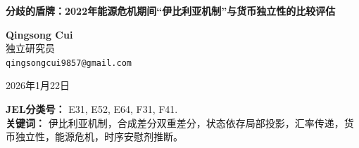 \documentclass[12pt, a4paper]{article}
\begin{document}
\begin{titlepage}
    \centering
    \vspace*{1cm}
    
    {\Large \textbf{分歧的盾牌：2022年能源危机期间“伊比利亚机制”与货币独立性的比较评估}}
    
    \vspace{1.5cm}
    
    \textbf{Qingsong Cui} \\ \relax
    独立研究员 \\ \relax
    \texttt{qingsongcui9857@gmail.com}
    
    \vspace{1cm}
    2026年1月22日
    
    \vspace{2cm}
    
    \begin{abstract}
        \noindent \singlespacing 2022年的能源危机对欧洲构成了对称的贸易条件冲击，却引发了截然不同的国家政策反应。本文对比了西班牙（欧元区成员）的结构性干预主义与波兰（通胀目标制国家）的正统稳定化组合。我们采用双重识别策略来量化这些方法的权衡。首先，利用Arkhangelsky et al.\ (2021)的\textbf{合成差分双重差分法（SDID）}，我们估计”伊比利亚例外机制”（\textit{Excepci\'{o}n Ib\'{e}rica}）使整体通胀降低了\textbf{3.21个百分点}（时序安慰剂$p=0.000$；刀切95\%置信区间$[-3.77, -2.65]$），有效地将国内价格与全球边际天然气价格脱钩。其次，利用Auerbach和Gorodnichenko (2012)的\textbf{状态依存局部投影法（SD-LP）}，我们识别出汇率传递的显著非对称性：在危机状态（高能源波动）下，核心通胀的汇率传递系数在12个月地平线处为\textbf{0.69}（$p=0.006$），而正常状态下为0.34（$p=0.403$）。在对称牺牲比率框架下，西班牙的财政牺牲比率（0.15\% GDP每pp）约为波兰（0.71\%）的五分之一。这些发现挑战了在存在货币错配的情况下，单纯依靠货币政策应对供给侧能源冲击的最优性。
    \end{abstract}
    
    \vspace{1cm}
    
    \noindent \textbf{JEL分类号：} E31, E52, E64, F31, F41. \\
    \noindent \textbf{关键词：} 伊比利亚机制，合成差分双重差分，状态依存局部投影，汇率传递，货币独立性，能源危机，时序安慰剂推断。
    
    \vfill
    
\end{titlepage}

\newpage

\end{document}
